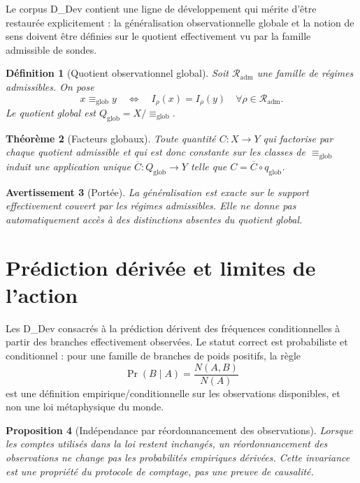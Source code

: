 \documentclass[11pt,a4paper,openany]{book}
\newtheorem{definition}{Définition}[chapter]
\newtheorem{proposition}[definition]{Proposition}
\newtheorem{theorem}[definition]{Théorème}
\newtheorem{warning}[definition]{Avertissement}
\begin{document}
Le corpus D\_Dev contient une ligne de développement qui mérite d'être restaurée explicitement : la généralisation observationnelle globale et la notion de sens doivent être définies sur le quotient effectivement vu par la famille admissible de sondes.

\begin{definition}[Quotient observationnel global]
Soit \(\mathcal R_{\mathrm{adm}}\) une famille de régimes admissibles. On pose
\[
x\equiv_{\mathrm{glob}}y
\quad\Longleftrightarrow\quad
I_\rho(x)=I_\rho(y)\quad\forall\rho\in\mathcal R_{\mathrm{adm}}.
\]
Le quotient global est \(Q_{\mathrm{glob}}=X/{\equiv_{\mathrm{glob}}}\).
\end{definition}

\begin{theorem}[Facteurs globaux]
Toute quantité \(C:X\to Y\) qui factorise par chaque quotient admissible et qui est donc constante sur les classes de \(\equiv_{\mathrm{glob}}\) induit une application unique \(\overline C:Q_{\mathrm{glob}}\to Y\) telle que \(C=\overline C\circ q_{\mathrm{glob}}\).
\end{theorem}

\begin{warning}[Portée]
La généralisation est exacte sur le support effectivement couvert par les régimes admissibles. Elle ne donne pas automatiquement accès à des distinctions absentes du quotient global.
\end{warning}

\section{Prédiction dérivée et limites de l'action}

Les D\_Dev consacrés à la prédiction dérivent des fréquences conditionnelles à partir des branches effectivement observées. Le statut correct est probabiliste et conditionnel : pour une famille de branches de poids positifs, la règle
\[
\Pr(B\mid A)=\frac{N(A,B)}{N(A)}
\]
est une définition empirique/conditionnelle sur les observations disponibles, et non une loi métaphysique du monde.

\begin{proposition}[Indépendance par réordonnancement des observations]
Lorsque les comptes utilisés dans la loi restent inchangés, un réordonnancement des observations ne change pas les probabilités empiriques dérivées. Cette invariance est une propriété du protocole de comptage, pas une preuve de causalité.
\end{proposition}
\end{document}
